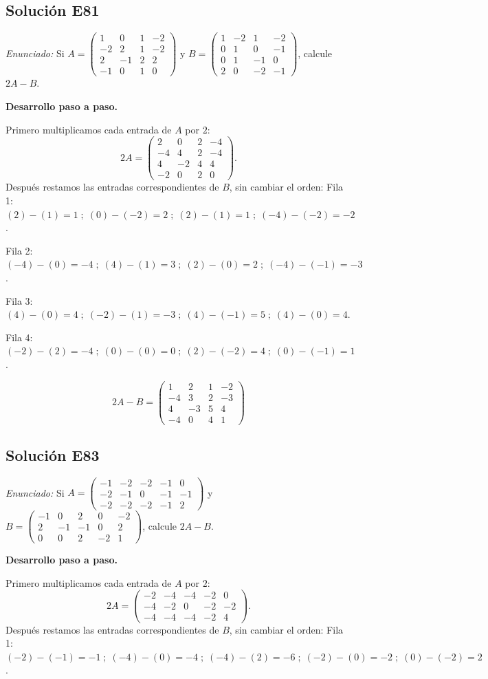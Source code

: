 \documentclass[12pt]{article}
\theoremstyle{remark}
\newcommand{\solucion}[2]{\Needspace{11\baselineskip}\subsection*{Solución E#1}\noindent\textit{Enunciado:} #2\par\medskip\noindent\textbf{Desarrollo paso a paso.}\par\medskip}
\begin{document}
\solucion{81}{Si $A=\begin{pmatrix}1&0&1&-2\\-2&2&1&-2\\2&-1&2&2\\-1&0&1&0\end{pmatrix}$ y $B=\begin{pmatrix}1&-2&1&-2\\0&1&0&-1\\0&1&-1&0\\2&0&-2&-1\end{pmatrix}$, calcule $2A-B$.}
Primero multiplicamos cada entrada de $A$ por $2$:
\[
2A=\begin{pmatrix}2&0&2&-4\\-4&4&2&-4\\4&-2&4&4\\-2&0&2&0\end{pmatrix}.
\]
Después restamos las entradas correspondientes de $B$, sin cambiar el orden:
Fila 1: $(2)-(1)=1\; ;\; (0)-(-2)=2\; ;\; (2)-(1)=1\; ;\; (-4)-(-2)=-2$.

Fila 2: $(-4)-(0)=-4\; ;\; (4)-(1)=3\; ;\; (2)-(0)=2\; ;\; (-4)-(-1)=-3$.

Fila 3: $(4)-(0)=4\; ;\; (-2)-(1)=-3\; ;\; (4)-(-1)=5\; ;\; (4)-(0)=4$.

Fila 4: $(-2)-(2)=-4\; ;\; (0)-(0)=0\; ;\; (2)-(-2)=4\; ;\; (0)-(-1)=1$.

\[
\boxed{2A-B=\begin{pmatrix}1&2&1&-2\\-4&3&2&-3\\4&-3&5&4\\-4&0&4&1\end{pmatrix}}
\]

\medskip

\solucion{83}{Si $A=\begin{pmatrix}-1&-2&-2&-1&0\\-2&-1&0&-1&-1\\-2&-2&-2&-1&2\end{pmatrix}$ y $B=\begin{pmatrix}-1&0&2&0&-2\\2&-1&-1&0&2\\0&0&2&-2&1\end{pmatrix}$, calcule $2A-B$.}
Primero multiplicamos cada entrada de $A$ por $2$:
\[
2A=\begin{pmatrix}-2&-4&-4&-2&0\\-4&-2&0&-2&-2\\-4&-4&-4&-2&4\end{pmatrix}.
\]
Después restamos las entradas correspondientes de $B$, sin cambiar el orden:
Fila 1: $(-2)-(-1)=-1\; ;\; (-4)-(0)=-4\; ;\; (-4)-(2)=-6\; ;\; (-2)-(0)=-2\; ;\; (0)-(-2)=2$.
\end{document}
